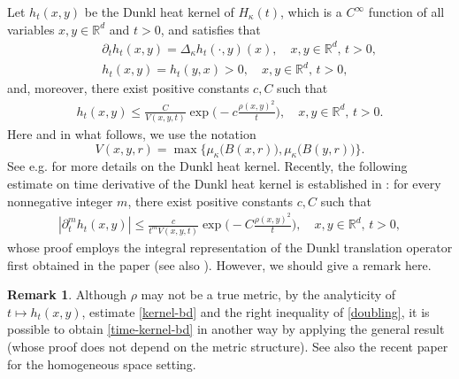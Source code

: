 \documentclass[11pt,a4paper]{article}
\def\R{\mathbb{R}}
\def\d{\textup{d}}
\theoremstyle{definition}\newtheorem{remark}[theorem]{Remark}
\begin{document}
Let $h_t(x,y)$ be the Dunkl heat kernel of $H_\kappa(t)$, which is a $C^\infty$ function of all variables $x,y\in\R^d$ and $t>0$, and satisfies that
\begin{eqnarray*}
&&\partial_t h_t(x,y)=\Delta_\kappa h_t(\cdot,y)(x),\quad x,y\in\R^d,\,t>0,\\
&&h_t(x,y)=h_t(y,x)>0,\quad x,y\in\R^d,\,t>0,
\end{eqnarray*} and, moreover, there exist positive constants $c,C$ such that
\begin{eqnarray}\label{kernel-bd}
h_t(x,y)\leq \frac{C}{V(x,y,t)}\exp\Big(-c\frac{\rho(x,y)^2}{t}\Big),\quad x,y\in\R^d,\,t>0.
\end{eqnarray}
Here and in what follows, we use the notation
$$V(x,y,r)=\max\big\{\mu_\kappa\big(B(x,r)\big),\mu_\kappa\big(B(y,r)\big)\big\}.$$
See e.g. \cite{Rosler2003} for more details on the Dunkl heat kernel. Recently, the following estimate on time derivative of the Dunkl heat kernel is established in \cite[Theorem 4.1(a)]{ADH2019}: for every nonnegative integer $m$, there exist positive constants $c,C$ such that
\begin{eqnarray}\label{time-kernel-bd}
| \partial_t^m h_t(x,y)|\leq \frac{c}{t^{m}V(x,y,t)}\exp\Big(-C\frac{\rho(x,y)^2}{t}\Big),\quad x,y\in\R^d,\,t>0,
\end{eqnarray}
whose proof employs the integral representation of the Dunkl translation operator first obtained in the paper \cite{Rosler2003a} (see also \cite[Lemma 3.4]{DaiWang2010}). However, we should give a remark here.
\begin{remark}
Although $\rho$ may not be a true metric, by the analyticity of $t\mapsto h_t(x,y)$, estimate \eqref{kernel-bd} and  the right inequality of \eqref{doubling},   it is possible to obtain \eqref{time-kernel-bd} in another way by applying the general result \cite[Theorem 4]{Davies1997} (whose proof does not depend on the metric structure). See also the recent paper \cite{DziPre2018} for the homogeneous space setting.
\end{remark}
\end{document}
